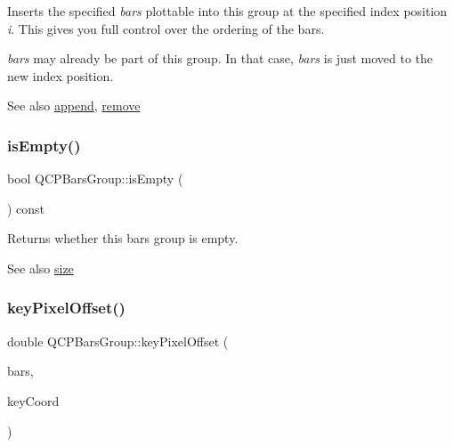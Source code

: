 Inserts the specified {\itshape bars} plottable into this group at the specified index position {\itshape i}. This gives you full control over the ordering of the bars.

{\itshape bars} may already be part of this group. In that case, {\itshape bars} is just moved to the new index position.

\begin{DoxySeeAlso}{See also}
\mbox{\hyperlink{class_q_c_p_bars_group_a809ed63cc4ff7cd5b0b8c96b470163d3}{append}}, \mbox{\hyperlink{class_q_c_p_bars_group_a215e28a5944f1159013a0e19169220e7}{remove}} 
\end{DoxySeeAlso}
\mbox{\label{class_q_c_p_bars_group_aac959e79e852e8ef9aea6e0449ad000a}} 
\subsubsection{\texorpdfstring{isEmpty()}{isEmpty()}}
{\footnotesize\ttfamily bool Q\+C\+P\+Bars\+Group\+::is\+Empty (\begin{DoxyParamCaption}{ }\end{DoxyParamCaption}) const\hspace{0.3cm}{\ttfamily [inline]}}

Returns whether this bars group is empty.

\begin{DoxySeeAlso}{See also}
\mbox{\hyperlink{class_q_c_p_bars_group_a3780ec77919cb00840207ec7a0f00dd5}{size}} 
\end{DoxySeeAlso}
\mbox{\label{class_q_c_p_bars_group_a8e2ca6002e7bab49670144d048a2bcc9}} 
\subsubsection{\texorpdfstring{keyPixelOffset()}{keyPixelOffset()}}
{\footnotesize\ttfamily double Q\+C\+P\+Bars\+Group\+::key\+Pixel\+Offset (\begin{DoxyParamCaption}\item[{const \mbox{\hyperlink{class_q_c_p_bars}{Q\+C\+P\+Bars}} $\ast$}]{bars,  }\item[{double}]{key\+Coord }\end{DoxyParamCaption})\hspace{0.3cm}{\ttfamily [protected]}}

